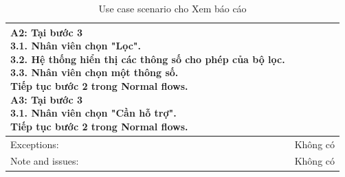 \begin{table}[H]
\begin{tabular}{|l|l|l|l|}
{        \textbf{A2: Tại bước 3}\newline
        3.1. Nhân viên chọn "Lọc".\newline
        3.2. Hệ thống hiển thị các thông số cho phép của bộ lọc.\newline
        3.3. Nhân viên chọn một thông số.\newline
        Tiếp tục bước 2 trong Normal flows.\newline
        \textbf{A3: Tại bước 3}\newline
        3.1. Nhân viên chọn "Cần hỗ trợ".\newline
        Tiếp tục bước 2 trong Normal flows.
        } \\
        \hline
        Exceptions: & \multicolumn{3}{|p{12cm}|}{Không có} \\
        \hline
        Note and issues: & \multicolumn{3}{|p{12cm}|}{Không có} \\
        \hline
    \end{tabular}
    \caption{Use case scenario cho Xem báo cáo}
\end{table}


